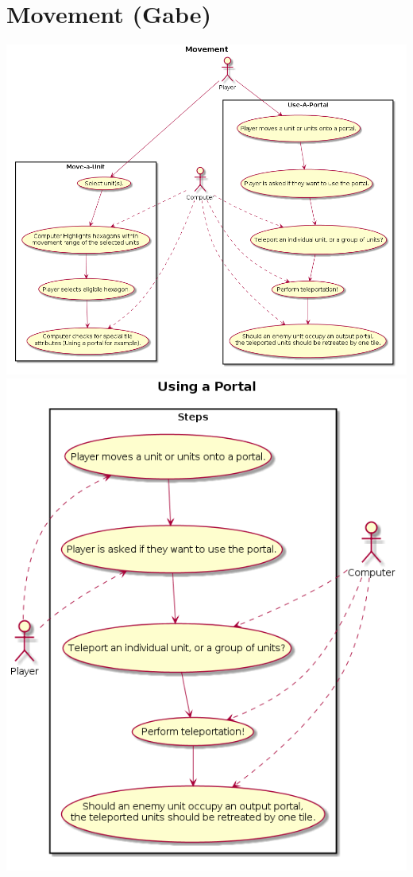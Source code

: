 \documentclass[12pt,letterpaper]{scrreprt}
\begin{document}
\section{Movement (Gabe)}
\includegraphics[scale=0.5]{MovementUseCaseDiagrams.png}
\newpage
\includegraphics[scale=0.6]{PortalUseCaseDiagram.png}
\end{document}
